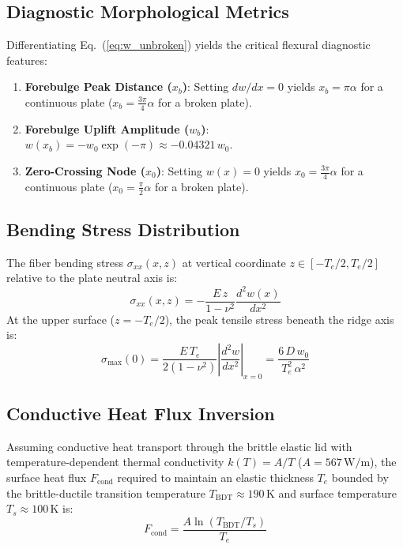 \documentclass[11pt,a4paper]{article}
\begin{document}
\subsection{Diagnostic Morphological Metrics}
Differentiating Eq.~(\ref{eq:w_unbroken}) yields the critical flexural diagnostic features:
\begin{enumerate}
    \item \textbf{Forebulge Peak Distance ($x_b$)}: Setting $dw/dx = 0$ yields $x_b = \pi \alpha$ for a continuous plate ($x_b = \frac{3\pi}{4}\alpha$ for a broken plate).
    \item \textbf{Forebulge Uplift Amplitude ($w_b$)}: $w(x_b) = -w_0 \exp(-\pi) \approx -0.04321 \, w_0$.
    \item \textbf{Zero-Crossing Node ($x_0$)}: Setting $w(x) = 0$ yields $x_0 = \frac{3\pi}{4}\alpha$ for a continuous plate ($x_0 = \frac{\pi}{2}\alpha$ for a broken plate).
\end{enumerate}

\subsection{Bending Stress Distribution}
The fiber bending stress $\sigma_{xx}(x, z)$ at vertical coordinate $z \in [-T_e/2, T_e/2]$ relative to the plate neutral axis is:
\begin{equation}
\sigma_{xx}(x, z) = -\frac{E \, z}{1 - \nu^2} \frac{d^2 w(x)}{dx^2}
\label{eq:bending_stress}
\end{equation}
At the upper surface ($z = -T_e/2$), the peak tensile stress beneath the ridge axis is:
\begin{equation}
\sigma_{\max}(0) = \frac{E \, T_e}{2(1 - \nu^2)} \left| \frac{d^2 w}{dx^2} \right|_{x=0} = \frac{6 \, D \, w_0}{T_e^2 \, \alpha^2}
\label{eq:sigma_peak}
\end{equation}

\subsection{Conductive Heat Flux Inversion}
Assuming conductive heat transport through the brittle elastic lid with temperature-dependent thermal conductivity $k(T) = A / T$ ($A = 567\,\text{W/m}$), the surface heat flux $F_{\text{cond}}$ required to maintain an elastic thickness $T_e$ bounded by the brittle-ductile transition temperature $T_{\text{BDT}} \approx 190\,\text{K}$ and surface temperature $T_s \approx 100\,\text{K}$ is:
\begin{equation}
F_{\text{cond}} = \frac{A \ln\left( T_{\text{BDT}} / T_s \right)}{T_e}
\label{eq:heat_flux}
\end{equation}
\end{document}
